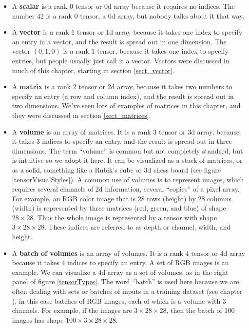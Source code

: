 \begin{itemize}
\item A \textbf{scalar} is a rank 0 tensor or 0d array because it requires no indices. The number 42 is a rank 0 tensor, a 0d array, but nobody talks about it that way. 
\item A \textbf{vector} is a rank 1 tensor or 1d array because it takes one index to specify an entry in a vector, and the result is spread out in one dimension. The vector $(0,1,0)$ is a rank 1 tensor, because it takes one index to specify entries, but people usually just call it a vector. Vectors were discussed in much of this chapter, starting in section \ref{sect_vector}.
\item A \textbf{matrix} is a rank 2 tensor or 2d array, because it takes two numbers to specify an entry (a row and column index), and the result is spread out in two dimensions. We've seen lots of examples of matrices in this chapter, and they were discussed in section \ref{sect_matrices}.
\item A \textbf{volume} is an array of matrices. It is a rank 3 tensor or 3d array, because it takes 3 indices to specify an entry, and the result is spread out in three dimensions. The term ``volume'' is common but not completely standard, but is intuitive so we adopt it here. It can be visualized as a stack of matrices, or as a solid, something like a Rubik's cube or 3d chess board (see figure \ref{tensorVisualStyles}). A common use of volumes is to represent images, which requires several channels of 2d information, several ``copies'' of a pixel array. For example, an RGB color image that is 28 rows (height) by 28 columns (width) is represented by three matrices (red, green, and blue) of shape $28 \times 28$. Thus the whole image is represented by a tensor with shape $3 \times 28 \times 28$. These indices are referred to as depth or channel, width, and height. 
\item A \textbf{batch of volumes} is an array of volumes. It is a rank 4 tensor or 4d array because it takes 4 indices to specify an entry. A set of RGB images is an example. We can visualize a 4d array as a set of volumes, as in the right panel of figure \ref{tensorTypes}. The word ``batch'' is used here because we are often dealing with sets or batches of inputs in a training dataset (see chapter ), in this case batches of RGB images, each of which is a volume with 3 channels. For example, if the images are $3 \times 28 \times 28$, then the batch of 100 images has shape $100 \times 3 \times 28 \times 28$. 
\end{itemize}

